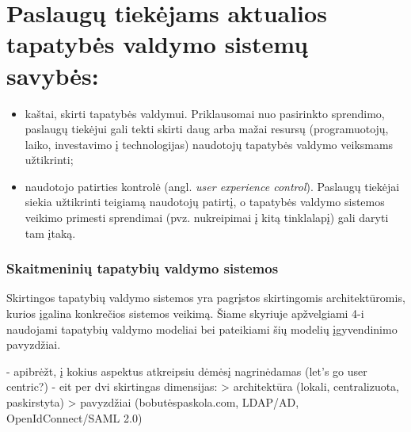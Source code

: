 \chapter{\textbf{Paslaugų tiekėjams aktualios tapatybės valdymo sistemų savybės:}}

\begin{itemize}
    \item kaštai, skirti tapatybės valdymui. Priklausomai nuo pasirinkto sprendimo,
    paslaugų tiekėjui gali tekti skirti daug arba mažai resursų (programuotojų, laiko, investavimo į technologijas)
    naudotojų tapatybės valdymo veiksmams užtikrinti;
    \item naudotojo patirties kontrolė (angl. \textit{user experience control}). Paslaugų tiekėjai siekia užtikrinti teigiamą
    naudotojų patirtį, o tapatybės valdymo sistemos veikimo primesti sprendimai (pvz. nukreipimai į kitą tinklalapį) gali daryti
    tam įtaką.
\end{itemize}

\subsection{Skaitmeninių tapatybių valdymo sistemos}

Skirtingos tapatybių valdymo sistemos yra pagrįstos skirtingomis architektūromis, kurios įgalina
konkrečios sistemos veikimą. Šiame skyriuje apžvelgiami 4-i naudojami tapatybių valdymo modeliai bei pateikiami
šių modelių įgyvendinimo pavyzdžiai.


- apibrėžt, į kokius aspektus atkreipsiu dėmėsį nagrinėdamas (let's go user centric?)
- eit per dvi skirtingas dimensijas:
    > architektūra (lokali, centralizuota, paskirstyta)
    > pavyzdžiai (bobutėspaskola.com, LDAP/AD, OpenIdConnect/SAML 2.0)